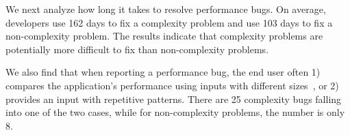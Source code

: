 


We next analyze how long it takes to resolve performance bugs. 
On average, developers use 162 days to fix a 
complexity problem and use 103 days to fix a non-complexity problem. 
The results indicate that complexity problems are potentially more difficult 
to fix than non-complexity problems. 


We also find that 
when reporting a performance bug, the end user often 
1) compares the application's performance 
using inputs with different sizes~\cite{SongOOPSLA2014}, 
or 2) provides an input with repetitive patterns. 
There are 25 complexity bugs falling into one of the two cases, 
while for non-complexity problems, the number is only 8.


